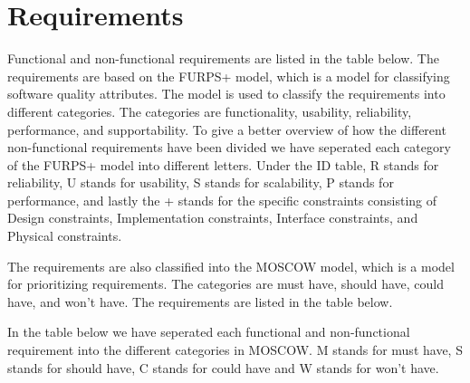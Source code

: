 
\section{Requirements}

Functional and non-functional\cite{example} requirements are listed in the table below. The requirements are based on the FURPS+ model, which is a model for classifying software quality attributes. The model is used to classify the requirements into different categories. The categories are functionality, usability, reliability, performance, and supportability.
To give a better overview of how the different non-functional requirements have been divided we have seperated each category of the FURPS+ model into different letters. Under the ID table, R stands for reliability, U stands for usability, S stands for scalability, P stands for performance, and lastly the + stands for the specific constraints consisting of Design constraints, Implementation constraints, Interface constraints, and Physical constraints. \newline

The requirements are also classified into the MOSCOW model, which is a model for prioritizing requirements. The categories are must have, should have, could have, and won't have. The requirements are listed in the table below. \newline

In the table below we have seperated each functional and non-functional requirement into the different categories in MOSCOW. M stands for must have, S stands for should have, C stands for could have and W stands for won't have.\newline

